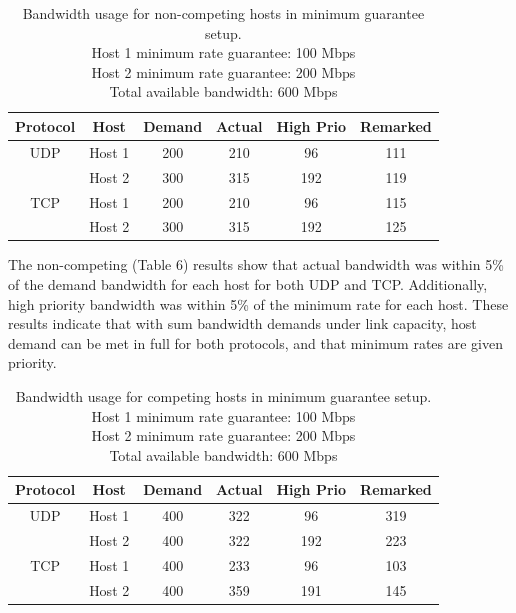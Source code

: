 \documentclass[accepted,single]{gipaper}
\begin{document}
\begin{table}[h]
	\label{mg_nc}
	\vspace{-2mm}
	\begin{center}
		\begin{small}
		\setlength\tabcolsep{1.5pt}
			\begin{tabular}{cccccc}
				Protocol & Host & Demand & Actual & High Prio & Remarked \\
				\hline
				UDP & Host 1 & 200 & 210 & 96 & 111\\
				    & Host 2 & 300 & 315 & 192 & 119\\
				\hline
				TCP & Host 1 & 200 & 210 & 96 & 115\\
				    & Host 2 & 300 & 315 & 192 & 125\\
			\end{tabular}
		\end{small}
	\end{center}
	\caption{Bandwidth usage for non-competing hosts in minimum guarantee setup.\\
	Host 1 minimum rate guarantee: 100 Mbps\\
	Host 2 minimum rate guarantee: 200 Mbps\\	
	Total available bandwidth: 600 Mbps}
	\vspace{-3mm}
\end{table}

The non-competing (Table 6) results show that actual bandwidth was within 5\% of the demand bandwidth for each host for both UDP and TCP. Additionally, high priority bandwidth was within 5\% of the minimum rate for each host. These results indicate that with sum bandwidth demands under link capacity, host demand can be met in full for both protocols, and that minimum rates are given priority.

\begin{table}[h]
	\label{mg_c}
	\vspace{-2mm}
	\begin{center}
		\begin{small}
		\setlength\tabcolsep{1.5pt}
			\begin{tabular}{cccccc}
				Protocol & Host & Demand & Actual & High Prio & Remarked \\
				\hline
				UDP & Host 1 & 400 & 322 & 96 & 319\\
				    & Host 2 & 400 & 322 & 192 & 223\\
				\hline
				TCP & Host 1 & 400 & 233 & 96 & 103\\
				    & Host 2 & 400 & 359 & 191 & 145\\
			\end{tabular}
		\end{small}
	\end{center}
	\caption{Bandwidth usage for competing hosts in minimum guarantee setup.\\
	Host 1 minimum rate guarantee: 100 Mbps\\
	Host 2 minimum rate guarantee: 200 Mbps\\	
	Total available bandwidth: 600 Mbps}
	\vspace{-3mm}
\end{table}
\end{document}
